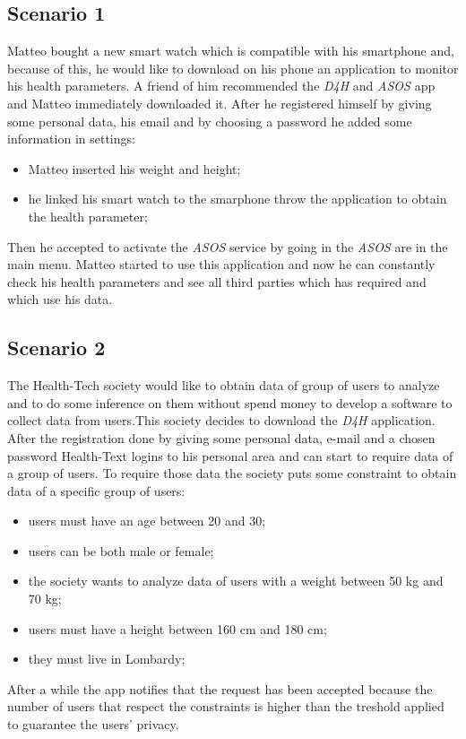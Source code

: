\subsection{Scenario 1}
Matteo bought a new smart watch which is compatible with his smartphone and, because of this, he would like to download on his phone an application to monitor his health parameters. 
A friend of him recommended the \textit{D4H} and \textit{ASOS} app and Matteo immediately downloaded it. After he registered himself by giving some personal data, his email and by choosing a password he added some information in settings:
\begin{itemize}
	\item {Matteo inserted his weight and height;}
	\item {he linked his smart watch to the smarphone throw the application to obtain the health parameter;}
\end{itemize}
Then he accepted to activate the \textit{ASOS} service by going in the \textit{ASOS} are in the main menu.
Matteo started to use this application and now he can constantly check his health parameters and see all third parties which has required and which use his data.

\subsection{Scenario 2}
The Health-Tech society would like to obtain data of group of users to analyze and to do some inference on them without spend money to develop a software to collect data from users.This society decides to download the \textit{D4H} application.
After the registration done by giving some personal data, e-mail and a chosen password Health-Text logins to his personal area and can start to require data of a group of users. To require those data the society puts some constraint to obtain data of a specific group of users:
\begin{itemize}
	\item {users must have an age between 20 and 30;}
	\item {users can be both male or female;}
	\item {the society wants to analyze data of users with a weight between 50 kg and 70 kg;}
	\item {users must have a height between 160 cm and 180 cm;}
	\item {they must live in Lombardy;}
\end{itemize}
After a while the app notifies that the request has been accepted because the number of users that respect the constraints is higher than the treshold applied to guarantee the users' privacy.

